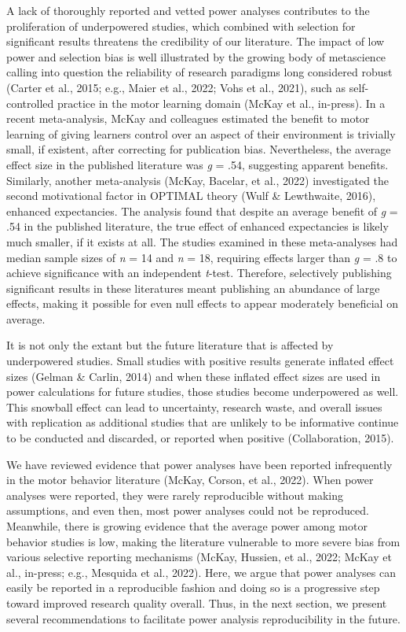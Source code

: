 \documentclass[
  doc, donotrepeattitle,floatsintext]{apa7}
\begin{document}
A lack of thoroughly reported and vetted power analyses contributes to the proliferation of underpowered studies, which combined with selection for significant results threatens the credibility of our literature. The impact of low power and selection bias is well illustrated by the growing body of metascience calling into question the reliability of research paradigms long considered robust (Carter et al., 2015; e.g., Maier et al., 2022; Vohs et al., 2021), such as self-controlled practice in the motor learning domain (McKay et al., in-press). In a recent meta-analysis, McKay and colleagues estimated the benefit to motor learning of giving learners control over an aspect of their environment is trivially small, if existent, after correcting for publication bias. Nevertheless, the average effect size in the published literature was \emph{g} = .54, suggesting apparent benefits. Similarly, another meta-analysis (McKay, Bacelar, et al., 2022) investigated the second motivational factor in OPTIMAL theory (Wulf \& Lewthwaite, 2016), enhanced expectancies. The analysis found that despite an average benefit of \emph{g} = .54 in the published literature, the true effect of enhanced expectancies is likely much smaller, if it exists at all. The studies examined in these meta-analyses had median sample sizes of \emph{n} = 14 and \emph{n} = 18, requiring effects larger than \emph{g} = .8 to achieve significance with an independent \emph{t}-test. Therefore, selectively publishing significant results in these literatures meant publishing an abundance of large effects, making it possible for even null effects to appear moderately beneficial on average.

It is not only the extant but the future literature that is affected by underpowered studies. Small studies with positive results generate inflated effect sizes (Gelman \& Carlin, 2014) and when these inflated effect sizes are used in power calculations for future studies, those studies become underpowered as well. This snowball effect can lead to uncertainty, research waste, and overall issues with replication as additional studies that are unlikely to be informative continue to be conducted and discarded, or reported when positive (Collaboration, 2015).

We have reviewed evidence that power analyses have been reported infrequently in the motor behavior literature (McKay, Corson, et al., 2022). When power analyses were reported, they were rarely reproducible without making assumptions, and even then, most power analyses could not be reproduced. Meanwhile, there is growing evidence that the average power among motor behavior studies is low, making the literature vulnerable to more severe bias from various selective reporting mechanisms (McKay, Hussien, et al., 2022; McKay et al., in-press; e.g., Mesquida et al., 2022). Here, we argue that power analyses can easily be reported in a reproducible fashion and doing so is a progressive step toward improved research quality overall. Thus, in the next section, we present several recommendations to facilitate power analysis reproducibility in the future.
\end{document}
